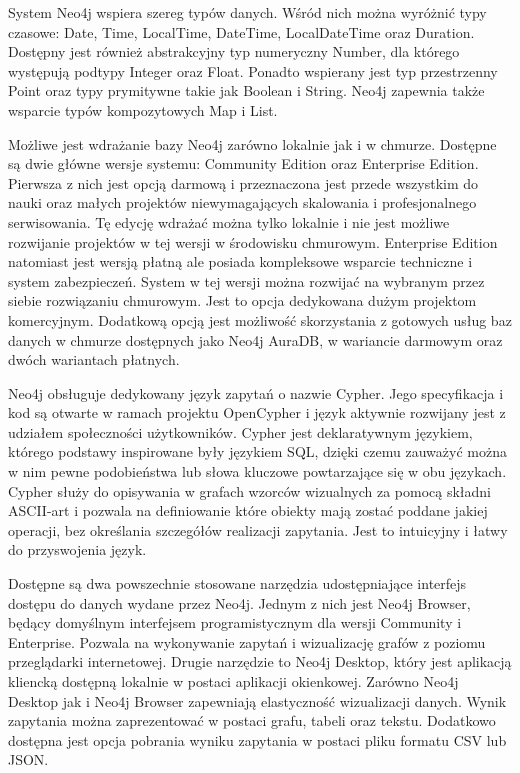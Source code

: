 \documentclass[a4paper,twoside,12pt]{book}
\begin{document}
System Neo4j wspiera szereg typów danych. Wśród nich można wyróżnić typy czasowe: Date, Time, LocalTime, DateTime, LocalDateTime oraz Duration. Dostępny jest również abstrakcyjny typ numeryczny Number, dla którego występują podtypy Integer oraz Float. Ponadto wspierany jest typ przestrzenny Point oraz typy prymitywne takie jak Boolean i String. Neo4j zapewnia także wsparcie typów kompozytowych Map i List.

Możliwe jest wdrażanie bazy Neo4j zarówno lokalnie jak i w chmurze. Dostępne są dwie główne wersje systemu: Community Edition oraz Enterprise Edition. Pierwsza z nich jest opcją darmową i przeznaczona jest przede wszystkim do nauki oraz małych projektów niewymagających skalowania i profesjonalnego serwisowania. Tę edycję wdrażać można tylko lokalnie i nie jest możliwe rozwijanie projektów w tej wersji w środowisku chmurowym. Enterprise Edition natomiast jest wersją płatną ale posiada kompleksowe wsparcie techniczne i system zabezpieczeń. System w tej wersji można rozwijać na wybranym przez siebie rozwiązaniu chmurowym. Jest to opcja dedykowana dużym projektom komercyjnym. Dodatkową opcją jest możliwość skorzystania z gotowych usług baz danych w chmurze dostępnych jako Neo4j AuraDB, w wariancie darmowym oraz dwóch wariantach płatnych.

Neo4j obsługuje dedykowany język zapytań o nazwie Cypher. Jego specyfikacja i kod są otwarte w ramach projektu OpenCypher i język aktywnie rozwijany jest z udziałem społeczności użytkowników. Cypher jest deklaratywnym językiem, którego podstawy inspirowane były językiem SQL, dzięki czemu zauważyć można w nim pewne podobieństwa lub słowa kluczowe powtarzające się w obu językach. Cypher służy do opisywania w grafach wzorców wizualnych za pomocą składni ASCII-art i pozwala na definiowanie które obiekty mają zostać poddane jakiej operacji, bez określania szczegółów realizacji zapytania. Jest to intuicyjny i łatwy do przyswojenia język.

Dostępne są dwa powszechnie stosowane narzędzia udostępniające interfejs dostępu do danych wydane przez Neo4j. Jednym z nich jest Neo4j Browser, będący domyślnym interfejsem programistycznym dla wersji Community i Enterprise. Pozwala na wykonywanie zapytań i wizualizację grafów z poziomu przeglądarki internetowej. Drugie narzędzie to Neo4j Desktop, który jest aplikacją kliencką dostępną lokalnie w postaci aplikacji okienkowej. Zarówno Neo4j Desktop jak i Neo4j Browser zapewniają elastyczność wizualizacji danych. Wynik zapytania można zaprezentować w postaci grafu, tabeli oraz tekstu. Dodatkowo dostępna jest opcja pobrania wyniku zapytania w postaci pliku formatu CSV lub JSON.
\end{document}
